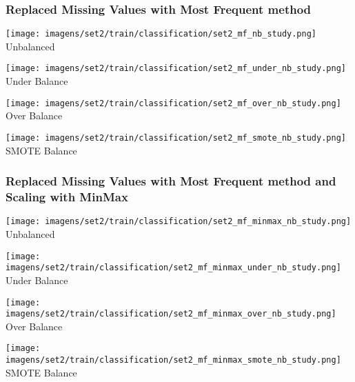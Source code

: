 \documentclass[11pt]{article}
\begin{document}
\subsubsection*{Replaced Missing Values with Most Frequent method}

\begin{figure*}[!htp]
    \begin{minipage}[!htp]{.25\textwidth}
        \centering
        \texttt{[image: imagens/set2/train/classification/set2\_mf\_nb\_study.png]}
        Unbalanced
    \end{minipage}\hfill
    \begin{minipage}[!htp]{.25\textwidth}
        \centering
        \texttt{[image: imagens/set2/train/classification/set2\_mf\_under\_nb\_study.png]}
        Under Balance
    \end{minipage}\hfill
    \begin{minipage}[!htp]{.25\textwidth}
        \centering
        \texttt{[image: imagens/set2/train/classification/set2\_mf\_over\_nb\_study.png]}
        Over Balance
    \end{minipage}\hfill
    \begin{minipage}[!htp]{.25\textwidth}
        \centering
        \texttt{[image: imagens/set2/train/classification/set2\_mf\_smote\_nb\_study.png]}
        SMOTE Balance
    \end{minipage}
\end{figure*}

\subsubsection*{Replaced Missing Values with Most Frequent method and Scaling with MinMax}

\begin{figure*}[!htp]
    \begin{minipage}[!htp]{.25\textwidth}
        \centering
        \texttt{[image: imagens/set2/train/classification/set2\_mf\_minmax\_nb\_study.png]}
        Unbalanced
    \end{minipage}\hfill
    \begin{minipage}[!htp]{.25\textwidth}
        \centering
        \texttt{[image: imagens/set2/train/classification/set2\_mf\_minmax\_under\_nb\_study.png]}
        Under Balance
    \end{minipage}\hfill
    \begin{minipage}[!htp]{.25\textwidth}
        \centering
        \texttt{[image: imagens/set2/train/classification/set2\_mf\_minmax\_over\_nb\_study.png]}
        Over Balance
    \end{minipage}\hfill
    \begin{minipage}[!htp]{.25\textwidth}
        \centering
        \texttt{[image: imagens/set2/train/classification/set2\_mf\_minmax\_smote\_nb\_study.png]}
        SMOTE Balance
    \end{minipage}
\end{figure*}
\end{document}
